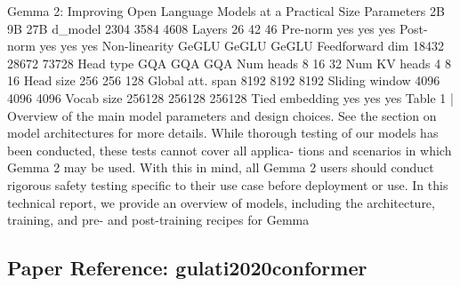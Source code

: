 Gemma 2: Improving Open Language Models at a Practical Size Parameters 2B 9B 27B d_model 2304 3584 4608 Layers 26 42 46 Pre-norm yes yes yes Post-norm yes yes yes Non-linearity GeGLU GeGLU GeGLU Feedforward dim 18432 28672 73728 Head type GQA GQA GQA Num heads 8 16 32 Num KV heads 4 8 16 Head size 256 256 128 Global att. span 8192 8192 8192 Sliding window 4096 4096 4096 Vocab size 256128 256128 256128 Tied embedding yes yes yes Table 1 | Overview of the main model parameters and design choices. See the section on model architectures for more details. While thorough testing of our models has been conducted, these tests cannot cover all applica- tions and scenarios in which Gemma 2 may be used. With this in mind, all Gemma 2 users should conduct rigorous safety testing specific to their use case before deployment or use. In this technical report, we provide an overview of models, including the architecture, training, and pre- and post-training recipes for Gemma

\vspace{18pt}


\subsection*{Paper Reference: gulati2020conformer}

